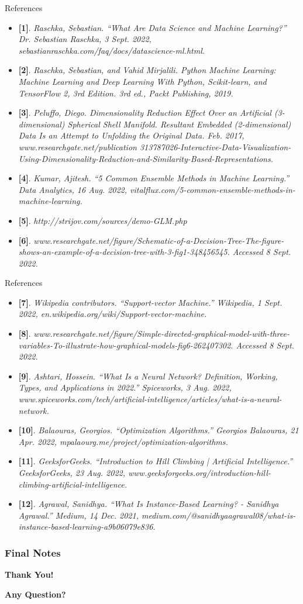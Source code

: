 \documentclass[compress,oilve]{beamer}
\begin{document}
\begin{frame}{References}
\begin{itemize}
\item{} \textbf{[1]}. \textit{Raschka, Sebastian. “What Are Data Science and Machine Learning?” Dr. Sebastian Raschka, 3 Sept. 2022, sebastianraschka.com/faq/docs/datascience-ml.html.}
\item{} \textbf{[2]}. \textit{Raschka, Sebastian, and Vahid Mirjalili. Python Machine Learning: Machine Learning and Deep Learning With Python, Scikit-learn, and TensorFlow 2, 3rd Edition. 3rd ed., Packt Publishing, 2019.}
\item{} \textbf{[3]}. \textit{Peluffo, Diego. Dimensionality Reduction Effect Over an Artificial (3-dimensional) Spherical Shell Manifold. Resultant Embedded (2-dimensional) Data Is an Attempt to Unfolding the Original Data. Feb. 2017, www.researchgate.net/publication 313787026-Interactive-Data-Visualization-Using-Dimensionality-Reduction-and-Similarity-Based-Representations.}
\item{} \textbf{[4]}. \textit{Kumar, Ajitesh. “5 Common Ensemble Methods in Machine Learning.” Data Analytics, 16 Aug. 2022, vitalflux.com/5-common-ensemble-methods-in-machine-learning.}
\item{} \textbf{[5]}. \textit{http://strijov.com/sources/demo-GLM.php}
\item{} \textbf{[6]}. \textit{www.researchgate.net/figure/Schematic-of-a-Decision-Tree-The-figure-shows-an-example-of-a-decision-tree-with-3-fig1-348456545. Accessed 8 Sept. 2022.}
\end{itemize}
\end{frame}


\begin{frame}{References}
\begin{itemize}
\item{} \textbf{[7]}. \textit{Wikipedia contributors. “Support-vector Machine.” Wikipedia, 1 Sept. 2022, en.wikipedia.org/wiki/Support-vector-machine.}
\item{} \textbf{[8]}. \textit{www.researchgate.net/figure/Simple-directed-graphical-model-with-three-variables-To-illustrate-how-graphical-models-fig6-262407302. Accessed 8 Sept. 2022.}
\item{} \textbf{[9]}. \textit{Ashtari, Hossein. “What Is a Neural Network? Definition, Working, Types, and Applications in 2022.” Spiceworks, 3 Aug. 2022, www.spiceworks.com/tech/artificial-intelligence/articles/what-is-a-neural-network.}
\item{} \textbf{[10]}. \textit{Balaouras, Georgios. “Optimization Algorithms.” Georgios Balaouras, 21 Apr. 2022, mpalaourg.me/project/optimization-algorithms.}
\item{} \textbf{[11]}. \textit{GeeksforGeeks. “Introduction to Hill Climbing | Artificial Intelligence.” GeeksforGeeks, 23 Aug. 2022, www.geeksforgeeks.org/introduction-hill-climbing-artificial-intelligence.}
\item{} \textbf{[12]}. \textit{Agrawal, Sanidhya. “What Is Instance-Based Learning? - Sanidhya Agrawal.” Medium, 14 Dec. 2021, medium.com/@sanidhyaagrawal08/what-is-instance-based-learning-a9b06079e836.}
\end{itemize}
\end{frame}


\frametitle{Final Notes}
\centering
\vspace{50 pt}
\textbf{Thank You!}
\vspace{50pt}

\textbf{Any Question?}
\end{document}
